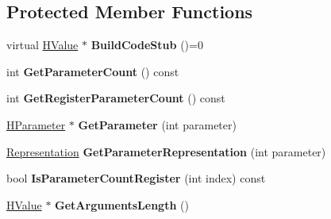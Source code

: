 \subsection*{Protected Member Functions}
\begin{DoxyCompactItemize}
\item 
virtual \hyperlink{classv8_1_1internal_1_1_h_value}{H\+Value} $\ast$ {\bfseries Build\+Code\+Stub} ()=0\hypertarget{classv8_1_1internal_1_1_code_stub_graph_builder_base_ac35068c39769b28e698535add3de7f25}{}\label{classv8_1_1internal_1_1_code_stub_graph_builder_base_ac35068c39769b28e698535add3de7f25}

\item 
int {\bfseries Get\+Parameter\+Count} () const \hypertarget{classv8_1_1internal_1_1_code_stub_graph_builder_base_afe7254edec5a3475deb45e1dbc6adc6b}{}\label{classv8_1_1internal_1_1_code_stub_graph_builder_base_afe7254edec5a3475deb45e1dbc6adc6b}

\item 
int {\bfseries Get\+Register\+Parameter\+Count} () const \hypertarget{classv8_1_1internal_1_1_code_stub_graph_builder_base_a4249883865a75e4c638c8937439d5a9b}{}\label{classv8_1_1internal_1_1_code_stub_graph_builder_base_a4249883865a75e4c638c8937439d5a9b}

\item 
\hyperlink{classv8_1_1internal_1_1_h_parameter}{H\+Parameter} $\ast$ {\bfseries Get\+Parameter} (int parameter)\hypertarget{classv8_1_1internal_1_1_code_stub_graph_builder_base_aef5c5814c912c939ae8b5a30a696ca04}{}\label{classv8_1_1internal_1_1_code_stub_graph_builder_base_aef5c5814c912c939ae8b5a30a696ca04}

\item 
\hyperlink{classv8_1_1internal_1_1_representation}{Representation} {\bfseries Get\+Parameter\+Representation} (int parameter)\hypertarget{classv8_1_1internal_1_1_code_stub_graph_builder_base_a7600be1ae944b94cb67789c88635f0ec}{}\label{classv8_1_1internal_1_1_code_stub_graph_builder_base_a7600be1ae944b94cb67789c88635f0ec}

\item 
bool {\bfseries Is\+Parameter\+Count\+Register} (int index) const \hypertarget{classv8_1_1internal_1_1_code_stub_graph_builder_base_a5bd6b6b97a7da79c32648263aadea21f}{}\label{classv8_1_1internal_1_1_code_stub_graph_builder_base_a5bd6b6b97a7da79c32648263aadea21f}

\item 
\hyperlink{classv8_1_1internal_1_1_h_value}{H\+Value} $\ast$ {\bfseries Get\+Arguments\+Length} ()\hypertarget{classv8_1_1internal_1_1_code_stub_graph_builder_base_a1c4a228c2f07db87dade6565af160e81}{}\label{classv8_1_1internal_1_1_code_stub_graph_builder_base_a1c4a228c2f07db87dade6565af160e81}


\end{DoxyCompactItemize}

